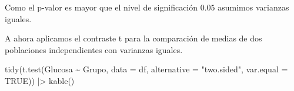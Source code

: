 \documentclass[
  spanish,
  a4paper,
]{scrreport}
\newenvironment{Shaded}{\begin{snugshade}}{\end{snugshade}}
\newcommand{\AttributeTok}[1]{\textcolor[rgb]{0.40,0.45,0.13}{#1}}
\newcommand{\ConstantTok}[1]{\textcolor[rgb]{0.56,0.35,0.01}{#1}}
\newcommand{\FunctionTok}[1]{\textcolor[rgb]{0.28,0.35,0.67}{#1}}
\newcommand{\NormalTok}[1]{\textcolor[rgb]{0.00,0.23,0.31}{#1}}
\newcommand{\SpecialCharTok}[1]{\textcolor[rgb]{0.37,0.37,0.37}{#1}}
\newcommand{\StringTok}[1]{\textcolor[rgb]{0.13,0.47,0.30}{#1}}
\theoremstyle{definition}
\theoremstyle{remark}
\begin{document}
\begin{tcolorbox}
Como el p-valor es mayor que el nivel de significación \(0.05\) asumimos
varianzas iguales.

A ahora aplicamos el contraste t para la comparación de medias de dos
poblaciones independientes con varianzas iguales.

\begin{Shaded}
\begin{Highlighting}[]
\FunctionTok{tidy}\NormalTok{(}\FunctionTok{t.test}\NormalTok{(Glucosa }\SpecialCharTok{\textasciitilde{}}\NormalTok{ Grupo, }\AttributeTok{data =}\NormalTok{ df, }\AttributeTok{alternative =} \StringTok{"two.sided"}\NormalTok{, }\AttributeTok{var.equal =} \ConstantTok{TRUE}\NormalTok{)) }\SpecialCharTok{|\textgreater{}} 
    \FunctionTok{kable}\NormalTok{()}
\end{Highlighting}
\end{Shaded}


\end{tcolorbox}
\end{document}
